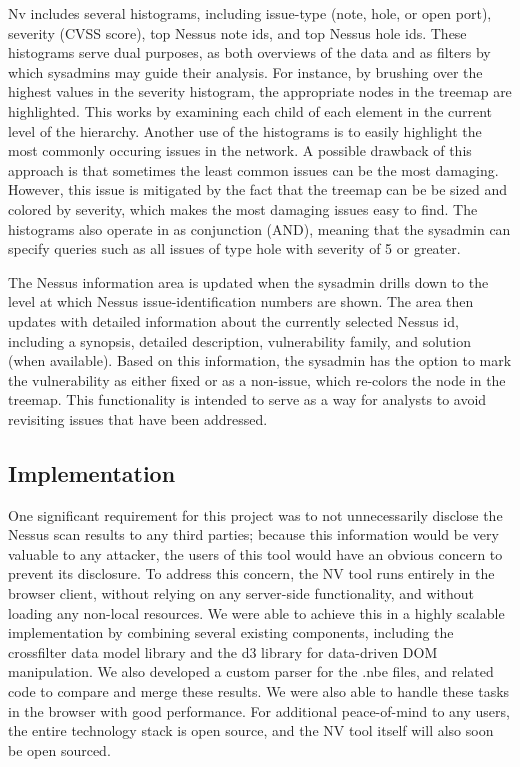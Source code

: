 \documentclass{acm_proc_article-sp}
\begin{document}
Nv includes several histograms, including issue-type (note, hole, or open port), severity (CVSS score), top Nessus note ids, and top Nessus hole ids.
These histograms serve dual purposes, as both overviews of the data and as filters by which sysadmins may guide their analysis.
For instance, by brushing over the highest values in the severity histogram, the appropriate nodes in the treemap are highlighted.
This works by examining each child of each element in the current level of the hierarchy.
Another use of the histograms is to easily highlight the most commonly occuring issues in the network.
A possible drawback of this approach is that sometimes the least common issues can be the most damaging.
However, this issue is mitigated by the fact that the treemap can be be sized and colored by severity, which makes the most damaging issues easy to find.
The histograms also operate in as conjunction (AND), meaning that the sysadmin can specify queries such as all issues of type hole with severity of 5 or greater.

The Nessus information area is updated when the sysadmin drills down to the level at which Nessus issue-identification numbers are shown.
The area then updates with detailed information about the currently selected Nessus id, including a synopsis, detailed description, vulnerability family, and solution (when available).
Based on this information, the sysadmin has the option to mark the vulnerability as either fixed or as a non-issue, which re-colors the node in the treemap.
This functionality is intended to serve as a way for analysts to avoid revisiting issues that have been addressed.


\subsection{Implementation}

One significant requirement for this project was to not unnecessarily disclose the Nessus scan results to any third parties; because this information would be very valuable to any attacker, the users of this tool would have an obvious concern to prevent its disclosure.
To address this concern, the NV tool runs entirely in the browser client, without relying on any server-side functionality, and without loading any non-local resources.
We were able to achieve this in a highly scalable implementation by combining several existing components, including the crossfilter data model library and the d3 library for data-driven DOM manipulation.
We also developed a custom parser for the .nbe files, and related code to compare and merge these results.
 We were also able to handle these tasks in the browser with good performance.
For additional peace-of-mind to any users, the entire technology stack is open source, and the NV tool itself will also soon be open sourced.
\end{document}
